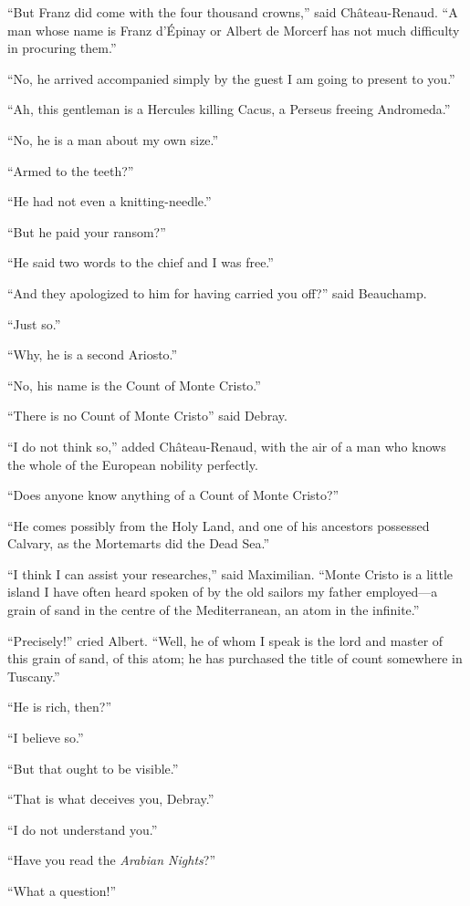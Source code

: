 “But Franz did come with the four thousand crowns,” said
Château-Renaud. “A man whose name is Franz d’Épinay or Albert de
Morcerf has not much difficulty in procuring them.”

“No, he arrived accompanied simply by the guest I am going to present
to you.”

“Ah, this gentleman is a Hercules killing Cacus, a Perseus freeing
Andromeda.”

“No, he is a man about my own size.”

“Armed to the teeth?”

“He had not even a knitting-needle.”

“But he paid your ransom?”

“He said two words to the chief and I was free.”

“And they apologized to him for having carried you off?” said
Beauchamp.

“Just so.”

“Why, he is a second Ariosto.”

“No, his name is the Count of Monte Cristo.”

“There is no Count of Monte Cristo” said Debray.

“I do not think so,” added Château-Renaud, with the air of a man who
knows the whole of the European nobility perfectly.

“Does anyone know anything of a Count of Monte Cristo?”

“He comes possibly from the Holy Land, and one of his ancestors
possessed Calvary, as the Mortemarts did the Dead Sea.”

“I think I can assist your researches,” said Maximilian. “Monte Cristo
is a little island I have often heard spoken of by the old sailors my
father employed—a grain of sand in the centre of the Mediterranean, an
atom in the infinite.”

“Precisely!” cried Albert. “Well, he of whom I speak is the lord and
master of this grain of sand, of this atom; he has purchased the title
of count somewhere in Tuscany.”

“He is rich, then?”

“I believe so.”

“But that ought to be visible.”

“That is what deceives you, Debray.”

“I do not understand you.”

“Have you read the \textit{Arabian Nights}?”

“What a question!”

